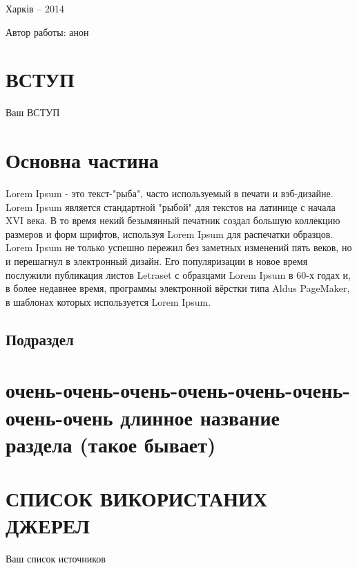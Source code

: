 \documentclass[a4paper, 14pt]{article}
\let\stdsection\section
\renewcommand\section{\newpage\stdsection}
\begin{document}
\begin{center}
Харків -- 2014 
\end{center}

\newpage
Автор работы: анон
\newpage

\renewcommand{\contentsname}{\normalsize \hspace{1.25em} ЗМІСТ} %

\tableofcontents %

\newpage
{} %
\section*{\textbf{ВСТУП}}
Ваш ВСТУП
\newpage %
\section{Основна частина}
Lorem Ipsum - это текст-"рыба", часто используемый в печати и вэб-дизайне. Lorem Ipsum является стандартной "рыбой" для текстов на латинице с начала XVI века. В то время некий безымянный печатник создал большую коллекцию размеров и форм шрифтов, используя Lorem Ipsum для распечатки образцов. Lorem Ipsum не только успешно пережил без заметных изменений пять веков, но и перешагнул в электронный дизайн. Его популяризации в новое время послужили публикация листов Letraset с образцами Lorem Ipsum в 60-х годах и, в более недавнее время, программы электронной вёрстки типа Aldus PageMaker, в шаблонах которых используется Lorem Ipsum.
\subsection{Подраздел}
\section{очень-очень-очень-очень-очень-очень-очень-очень длинное название раздела (такое бывает)}
\section*{СПИСОК ВИКОРИСТАНИХ ДЖЕРЕЛ}
Ваш список источников
\end{document}

